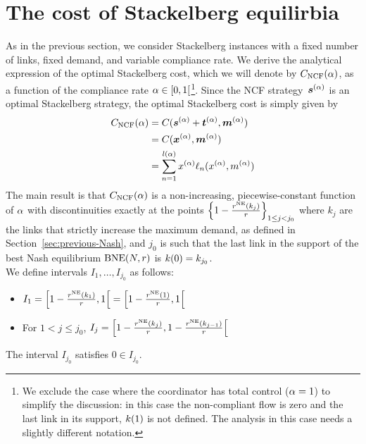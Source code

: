 

\section{The cost of Stackelberg equilirbia}
\label{sec:cost}

As in the previous section, we consider Stackelberg instances with a fixed number of links, fixed demand, and variable compliance rate. We derive the analytical expression of the optimal Stackelberg cost,  which we will denote by $C_{\textup{NCF}}(\alpha)$, as a function of the compliance rate $\alpha \in [0,1[$\footnote{We exclude the case where the coordinator has total control ($\alpha = 1$) to simplify the discussion: in this case the non-compliant flow is zero and the last link in its support, $k(1)$ is not defined. The analysis in this case needs a slightly different notation.}. Since the NCF strategy~$\boldsymbol {s}^{(\alpha)}$ is an optimal Stackelberg strategy, the optimal Stackelberg cost is simply given by
\begin{align}
C_{\textup{NCF}}(\alpha) 
&= C(\boldsymbol {s}^{(\alpha)} + \boldsymbol {t}^{(\alpha)}, \boldsymbol {m}^{(\alpha)})\\
&= C(\boldsymbol {x}^{(\alpha)}, \boldsymbol {m}^{(\alpha)})\\
&= \sum_{n=1}^{l(\alpha)} x^{(\alpha)} \ell_n(x^{(\alpha)}, m^{(\alpha)}) \label{eq:stackCost}
\end{align}
The main result is that $C_{\textup{NCF}}(\alpha)$ is a non-increasing, piecewise-constant function of $\alpha$ with discontinuities exactly at the points $\left\{1- \frac{ r^{\textup{NE}} ( k_{j} ) }{ r } \right\}_{1 \leq j < j_0}$ where $k_j$ are the links that strictly increase the maximum demand, as defined in Section~\ref{sec:previous-Nash}, and $j_0$ is such that the last link in the support of the best Nash equilibrium $\textup{BNE} (N, r)$ is $k(0) = k_{j_0}$.\\

We define intervals $I_1, \dots, I_{j_0}$ as follows:
\begin{itemize}
\item $I_1 = \left[1- \frac{r^{\textup{NE}} ( k_{1} )}{r}, 1\right[ = \left[1- \frac{r^{\textup{NE}} ( 1 )}{r}, 1\right[$
\item For $1 < j \leq j_0$, ${ I_j = \left[ 1- \frac{r^{\textup{NE}} ( k_{j} )}{r}, 1- \frac{r^{\textup{NE}} ( k_{j-1} )}{r} \right[ }$
\end{itemize}

\begin{proposition}
\label{prop:j_0}
The interval $I_{j_0}$ satisfies $0 \in I_{j_0}$.
\end{proposition}

